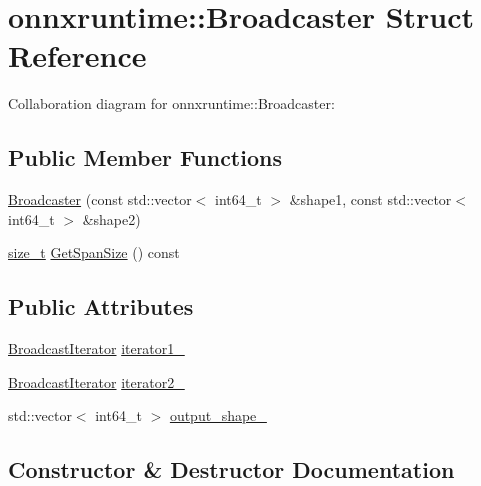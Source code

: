 \hypertarget{structonnxruntime_1_1Broadcaster}{}\section{onnxruntime\+:\+:Broadcaster Struct Reference}
\label{structonnxruntime_1_1Broadcaster}


Collaboration diagram for onnxruntime\+:\+:Broadcaster\+:
\subsection*{Public Member Functions}
\begin{DoxyCompactItemize}
\item 
\mbox{\hyperlink{structonnxruntime_1_1Broadcaster_a5764a68f37dc19f609ad74916e598c9d}{Broadcaster}} (const std\+::vector$<$ int64\+\_\+t $>$ \&shape1, const std\+::vector$<$ int64\+\_\+t $>$ \&shape2)
\item 
\mbox{\hyperlink{mlasi_8h_a503efbc1c6e50825320ad909366b78ab}{size\+\_\+t}} \mbox{\hyperlink{structonnxruntime_1_1Broadcaster_ae6594a091b038210b658727b109ec49e}{Get\+Span\+Size}} () const
\end{DoxyCompactItemize}
\subsection*{Public Attributes}
\begin{DoxyCompactItemize}
\item 
\mbox{\hyperlink{structonnxruntime_1_1BroadcastIterator}{Broadcast\+Iterator}} \mbox{\hyperlink{structonnxruntime_1_1Broadcaster_a82eac71829dfb28f71a7de305c1f7394}{iterator1\+\_\+}}
\item 
\mbox{\hyperlink{structonnxruntime_1_1BroadcastIterator}{Broadcast\+Iterator}} \mbox{\hyperlink{structonnxruntime_1_1Broadcaster_a3183a531f4cb4a64e65b17b8ac89bfd1}{iterator2\+\_\+}}
\item 
std\+::vector$<$ int64\+\_\+t $>$ \mbox{\hyperlink{structonnxruntime_1_1Broadcaster_a3bdfd2716dd93da8ba271c8ad0804415}{output\+\_\+shape\+\_\+}}
\end{DoxyCompactItemize}


\subsection{Constructor \& Destructor Documentation}
\mbox{\label{structonnxruntime_1_1Broadcaster_a5764a68f37dc19f609ad74916e598c9d}} 
